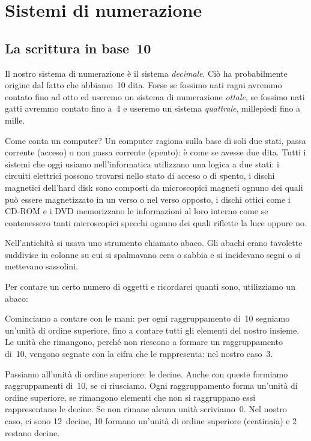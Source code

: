 \chapter{Sistemi di numerazione}
\section{La scrittura in base~10}
Il nostro sistema di numerazione è il sistema \emph{decimale}. Ciò ha
probabilmente origine dal fatto che abbiamo~10 dita. Forse se fossimo
nati ragni avremmo contato fino ad otto ed useremo un sistema di
numerazione \emph{ottale}, se fossimo nati gatti avremmo contato fino a~4 e
useremo un sistema \emph{quattrale}, millepiedi fino a mille.

Come conta un
computer? Un computer ragiona sulla base di soli due stati, passa corrente (acceso) o non
passa corrente (spento): è come se avesse due dita. Tutti i sistemi che oggi
usiamo nell'informatica utilizzano una logica a due stati: i circuiti elettrici possono trovarsi nello stato di acceso o di spento, i dischi magnetici
dell'hard disk sono composti da microscopici magneti ognuno dei quali può essere magnetizzato in un verso o nel verso opposto, i dischi
ottici come i CD-ROM
e i DVD memorizzano le informazioni al loro interno come se contenessero tanti microscopici specchi ognuno dei quali riflette la luce oppure no.

Nell'antichità si usava uno strumento chiamato abaco. Gli abachi erano tavolette suddivise in colonne su cui si spalmavano
cera o sabbia e si incidevano segni o si mettevano sassolini.

Per contare un certo numero di oggetti e ricordarci quanti sono, utilizziamo un abaco:
\begin{center}

\end{center}

Cominciamo a contare con le mani: per ogni raggruppamento di~10 segniamo un'unità di ordine superiore, fino a contare tutti
gli elementi del nostro insieme. Le unità che rimangono, perché non riescono a formare un raggruppamento di~10, vengono
segnate con la cifra che le rappresenta: nel nostro caso~3.

Passiamo all'unità di ordine superiore: le decine. Anche con queste formiamo raggruppamenti di~10, se ci riusciamo. Ogni
raggruppamento forma un'unità di ordine superiore, se rimangono elementi che non si raggruppano essi rappresentano le decine. Se non
rimane alcuna unità scriviamo~0. Nel nostro caso, ci sono 12~decine, 10 formano un'unità di ordine superiore (centinaia) e 2 restano decine.

